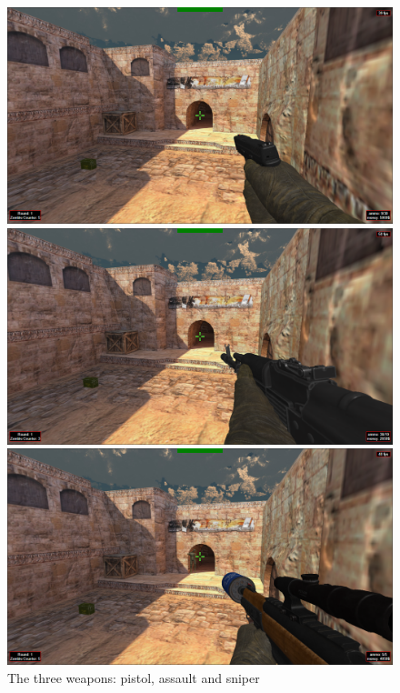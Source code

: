 \documentclass[12pt,a4paper,oneside]{article}
\theoremstyle{definition}
\begin{document}
\begin{figure}
\begin{multicols}{3}
    \includegraphics[width=\linewidth]{figures/pistol.png}\par 
    \includegraphics[width=\linewidth]{figures/assault.png}\par 
    \includegraphics[width=\linewidth]{figures/sniper.png}\par 
    \end{multicols}
\caption{The three weapons: pistol, assault and sniper}
\end{figure}
\end{document}
